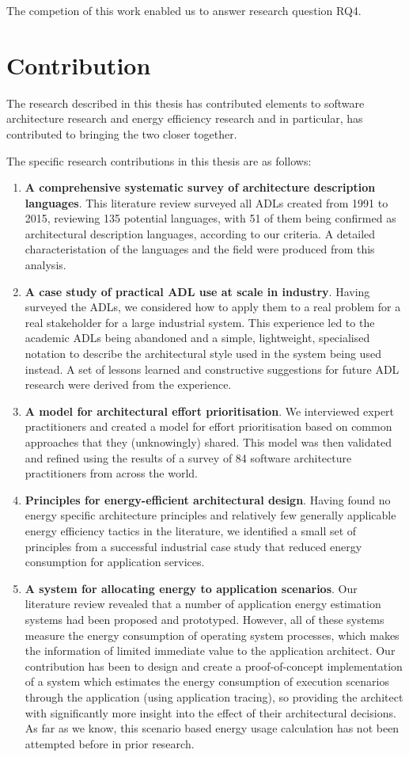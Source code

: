 The competion of this work enabled us to answer research question RQ4.

\section{Contribution}

The research described in this thesis has contributed elements to software architecture research and energy efficiency research and in particular, has contributed to bringing the two closer together.

The specific research contributions in this thesis are as follows: \nopagebreak
\begin{enumerate}
	\item \textbf{A comprehensive systematic survey of architecture description languages}.  This literature review surveyed all ADLs created from 1991 to 2015, reviewing 135 potential languages, with 51 of them being confirmed as architectural description languages, according to our criteria.  A detailed characteristation of the languages and the field were produced from this analysis.
	\item \textbf{A case study of practical ADL use at scale in industry}.  Having surveyed the ADLs, we considered how to apply them to a real problem for a real stakeholder for a large industrial system.  This experience led to the academic ADLs being abandoned and a simple, lightweight, specialised notation to describe the architectural style used in the system being used instead.  A set of lessons learned and constructive suggestions for future ADL research were derived from the experience.
	\item \textbf{A model for architectural effort prioritisation}.  We interviewed expert practitioners and created a model for effort prioritisation based on common approaches that they (unknowingly) shared.  This model was then validated and refined using the results of a survey of 84 software architecture practitioners from across the world.
	\item \textbf{Principles for energy-efficient architectural design}.  Having found no energy specific architecture principles and relatively few generally applicable energy efficiency tactics in the literature, we identified a small set of principles from a successful industrial case study that reduced energy consumption for application services.
	\item \textbf{A system for allocating energy to application scenarios}.  Our literature review revealed that a number of application energy estimation systems had been proposed and prototyped.  However, all of these systems measure the energy consumption of operating system processes, which makes the information of limited immediate value to the application architect.  Our contribution has been to design and create a proof-of-concept implementation of a system which estimates the energy consumption of execution scenarios through the application (using application tracing), so providing the architect with significantly more insight into the effect of their architectural decisions. As far as we know, this scenario based energy usage calculation has not been attempted before in prior research.

\end{enumerate}
